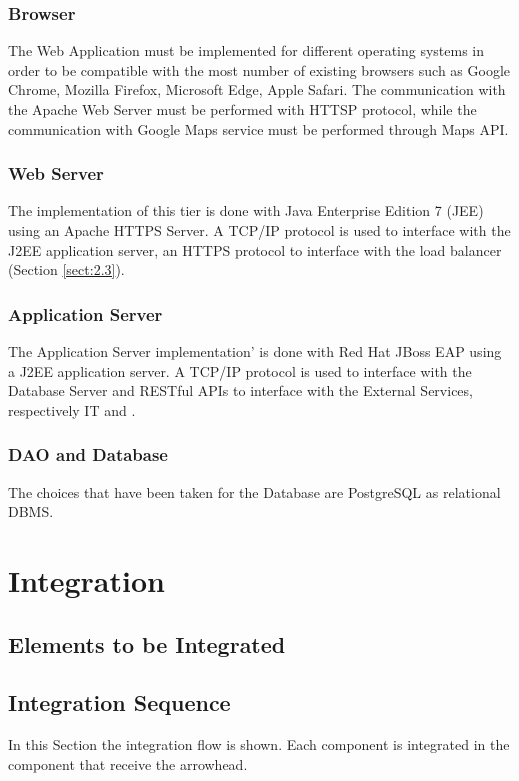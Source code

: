 \documentclass[../DD.tex]{subfiles}
\begin{document}
\subsubsection{Browser}
The Web Application must be implemented for different operating systems in order to be compatible with the most number of existing browsers such as Google Chrome, Mozilla Firefox, Microsoft Edge, Apple Safari. The communication with the Apache Web Server must be performed with HTTSP protocol, while the communication with Google Maps service must be performed through Maps API.

\subsubsection{Web Server}
The implementation of this tier is done with Java Enterprise Edition 7 (JEE) using an Apache HTTPS Server. A TCP/IP protocol is used to interface with the J2EE application server, an HTTPS protocol to interface with the load balancer (Section \ref{sect:2.3}). 

\subsubsection{Application Server}
The Application Server implementation' is done with Red Hat JBoss EAP using a J2EE application server. A TCP/IP protocol is used to interface with the Database Server and RESTful APIs to interface with the External Services, respectively  IT and  .

\subsubsection{DAO and Database}
The choices that have been taken for the Database are PostgreSQL as relational DBMS. 

\section{Integration\label{5.3}}

\subsection{Elements to be Integrated\label{5.3.1}}



\subsection{Integration Sequence\label{5.3.2}}
In this Section the integration flow is shown. Each component is integrated in the component that receive the arrowhead.
\end{document}
